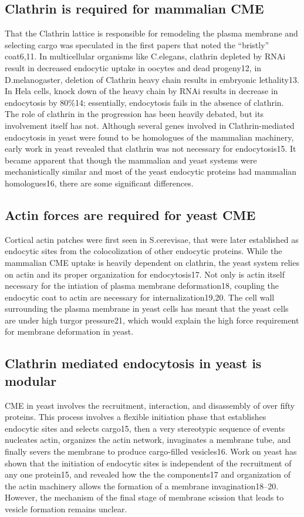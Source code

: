 		\subsection{Clathrin is required for mammalian CME}
That the Clathrin lattice is responsible for remodeling the plasma membrane and selecting cargo was speculated in the first papers that noted the “bristly” coat6,11.  In multicellular organisms like C.elegans, clathrin depleted by RNAi result in decreased endocytic uptake in oocytes and dead progeny12, in D.melanogaster, deletion of Clathrin heavy chain results in embryonic lethality13. In Hela cells, knock down of the heavy chain by RNAi results in decrease in endocytosis by 80\%14; essentially, endocytosis fails in the absence of clathrin. The role of clathrin in the progression has been heavily debated, but its involvement itself has not. Although several genes involved in Clathrin-mediated endocytosis in yeast were found to be homologues of the mammalian machinery, early work in yeast revealed that clathrin was not necessary for endocytosis15. It became apparent that though the mammalian and yeast systems were mechanistically similar and most of the yeast endocytic proteins had mammalian homologues16, there are some significant differences. 

		\subsection{Actin forces are required for yeast CME}
Cortical actin patches were first seen in S.cerevisae, that were later established as endocytic sites from the colocolization of other endocytic proteins. While the mammalian CME uptake is heavily dependent on clathrin, the yeast system relies on actin and its proper organization for endocytosis17. Not only is actin itself necessary for the intiation of plasma membrane deformation18, coupling the endocytic coat to actin are necessary for internalization19,20.  The cell wall surrounding the plasma membrane in yeast cells has meant that the yeast cells are under high turgor pressure21, which would explain the high force requirement for membrane deformation in yeast. 

	
		\subsection{Clathrin mediated endocytosis in yeast is modular}
	CME in yeast involves the recruitment, interaction, and disassembly of over fifty proteins. This process involves a flexible initiation phase that establishes endocytic sites and selects cargo15, then a very stereotypic sequence of events nucleates actin, organizes the actin network, invaginates a membrane tube, and finally severs the membrane to produce cargo-filled vesicles16. Work on yeast has shown that the initiation of endocytic sites is independent of the recruitment of any one protein15, and revealed how the the components17 and organization of the actin machinery allows the formation of a membrane invagination18–20. However, the mechanism of the final stage of membrane scission that leads to vesicle formation remains unclear.

